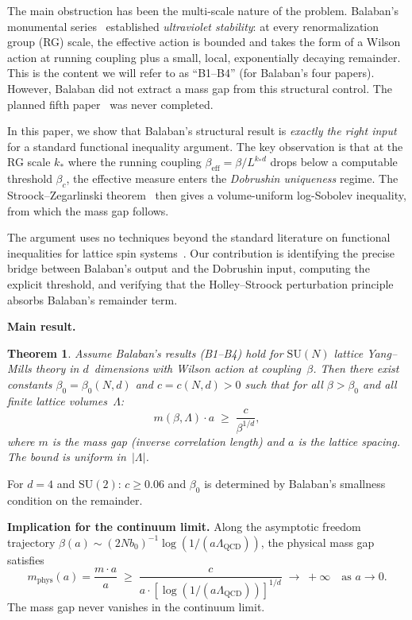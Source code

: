 \documentclass[11pt]{article}
\newtheorem{theorem}{Theorem}[section]
\theoremstyle{definition}
\theoremstyle{remark}
\newcommand{\SU}{\mathrm{SU}}
\begin{document}
The main obstruction has been the multi-scale nature of the problem.  
Balaban's monumental series~\cite{Balaban1,Balaban2,Balaban3,Balaban4} 
established \emph{ultraviolet stability}: at every renormalization 
group (RG) scale, the effective action is bounded and takes the form 
of a Wilson action at running coupling plus a small, local, 
exponentially decaying remainder.  This is the content we will 
refer to as ``B1--B4'' (for Balaban's four papers).  However, 
Balaban did not extract a mass gap from this structural control.  
The planned fifth paper~\cite{Balaban_unpublished} was never completed.

In this paper, we show that Balaban's structural result is 
\emph{exactly the right input} for a standard functional inequality 
argument.  The key observation is that at the RG scale $k_*$ where 
the running coupling $\beta_{\mathrm{eff}} = \beta/L^{k_* d}$ drops 
below a computable threshold $\beta_c$, the effective measure 
enters the \emph{Dobrushin uniqueness} regime.  The 
Stroock--Zegarlinski theorem~\cite{SZ92} then gives a 
volume-uniform log-Sobolev inequality, from which the mass gap 
follows.

The argument uses no techniques beyond the standard literature on 
functional inequalities for lattice spin 
systems~\cite{BGL,martinelli_lectures,SZ92}.  Our contribution is 
identifying the precise bridge between Balaban's output and the 
Dobrushin input, computing the explicit threshold, and verifying 
that the Holley--Stroock perturbation principle absorbs Balaban's 
remainder term.

\medskip
\noindent\textbf{Main result.}

\begin{theorem}\label{thm:main}
Assume Balaban's results \emph{(B1--B4)} hold for $\SU(N)$ lattice 
Yang--Mills theory in $d$~dimensions with Wilson action at 
coupling~$\beta$.  Then there exist constants 
$\beta_0 = \beta_0(N,d)$ and $c = c(N,d) > 0$ such that for all 
$\beta > \beta_0$ and all finite lattice volumes~$\Lambda$:
\[
  m(\beta, \Lambda) \cdot a \;\geq\; \frac{c}{\beta^{1/d}},
\]
where $m$ is the mass gap (inverse correlation length) and $a$ is 
the lattice spacing.  The bound is uniform in~$|\Lambda|$.
\end{theorem}

For $d = 4$ and $\SU(2)$: $c \geq 0.06$ and $\beta_0$ is 
determined by Balaban's smallness condition on the remainder.

\medskip
\noindent\textbf{Implication for the continuum limit.}
Along the asymptotic freedom trajectory 
$\beta(a) \sim (2Nb_0)^{-1}\log(1/(a\Lambda_{\mathrm{QCD}}))$, 
the physical mass gap satisfies
\[
  m_{\mathrm{phys}}(a) = \frac{m \cdot a}{a} \;\geq\; 
  \frac{c}{a \cdot [\log(1/(a\Lambda_{\mathrm{QCD}}))]^{1/d}} 
  \;\longrightarrow\; +\infty
  \quad \text{as } a \to 0.
\]
The mass gap never vanishes in the continuum limit.
\end{document}
